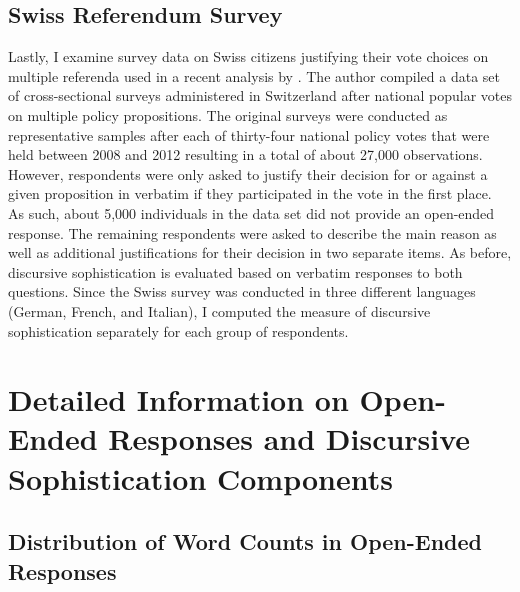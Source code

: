 \subsection*{Swiss Referendum Survey}
Lastly, I examine survey data on Swiss citizens justifying their vote choices on multiple referenda used in a recent analysis by \citet{colombo2016justifications}. The author compiled a data set of cross-sectional surveys administered in Switzerland after national popular votes on multiple policy propositions. The original surveys were conducted as representative samples after each of thirty-four national policy votes that were held between 2008 and 2012 resulting in a total of about 27,000 observations. However, respondents were only asked to justify their decision for or against a given proposition in verbatim if they participated in the vote in the first place. As such, about 5,000 individuals in the data set did not provide an open-ended response. The remaining respondents were asked to describe the main reason as well as additional justifications for their decision in two separate items. As before, discursive sophistication is evaluated based on verbatim responses to both questions. Since the Swiss survey was conducted in three different languages (German, French, and Italian), I computed the measure of discursive sophistication separately for each group of respondents.

\section[Information on Discursive Sophistication Components]{Detailed Information on Open-Ended Responses and Discursive Sophistication Components}\label{app:oeinfo}


\subsection{Distribution of Word Counts in Open-Ended Responses}

